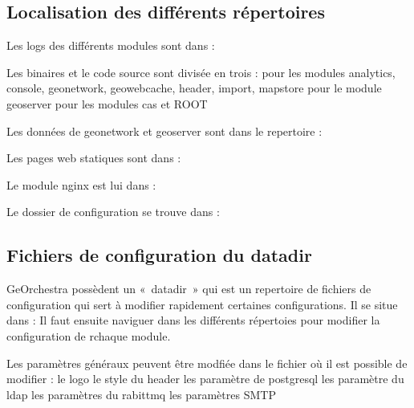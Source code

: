 \documentclass[letterpaper,10pt,french]{sphinxmanual}
\begin{document}
\subsection{Localisation des différents répertoires}
\label{\detokenize{doc_instal/configuration:localisation-des-differents-repertoires}}
\sphinxAtStartPar
Les logs des différents modules sont dans : 

\sphinxAtStartPar
Les binaires et le code source sont divisée en trois :
\sphinxhyphen{}  pour les modules analytics, console, geonetwork, geowebcache, header, import, mapstore
\sphinxhyphen{}  pour le module geoserver
\sphinxhyphen{}  pour les modules cas et ROOT

\sphinxAtStartPar
Les données de geonetwork et geoserver sont dans le repertoire : 

\sphinxAtStartPar
Les pages web statiques sont dans : 

\sphinxAtStartPar
Le module nginx est lui dans : 

\sphinxAtStartPar
Le dossier de configuration se trouve dans : 


\subsection{Fichiers de configuration du datadir}
\label{\detokenize{doc_instal/configuration:fichiers-de-configuration-du-datadir}}
\sphinxAtStartPar
GeOrchestra possèdent un « datadir » qui est un repertoire de fichiers de configuration qui sert à modifier rapidement certaines configurations.
Il se situe dans : 
Il faut ensuite naviguer dans les différents répertoies pour modifier la configuration de rchaque module.

\sphinxAtStartPar
Les paramètres généraux peuvent être modfiée dans le fichier  où il est possible de modifier :
\sphinxhyphen{} le logo
\sphinxhyphen{} le style du header
\sphinxhyphen{} les paramètre de postgresql
\sphinxhyphen{} les paramètre du ldap
\sphinxhyphen{} les paramètres du rabittmq
\sphinxhyphen{} les paramètres SMTP
\end{document}
